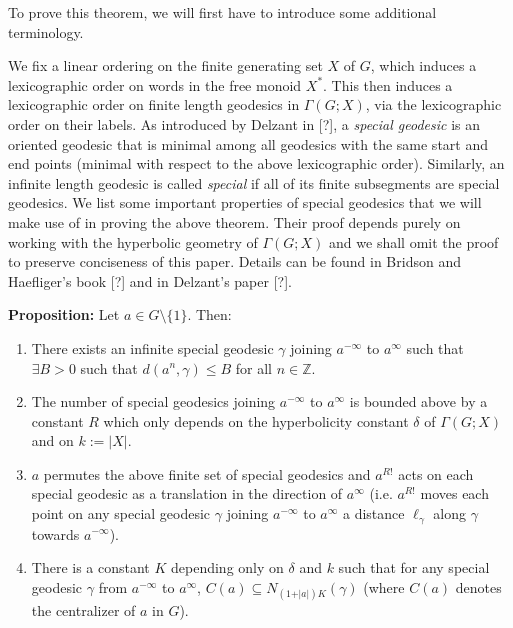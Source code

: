 \documentclass[12pt]{article}
\newcommand{\vs}{\vskip10pt}
\begin{document}
	\vs 
	
	To prove this theorem, we will first have to introduce some additional terminology. 
	
	\vs 
	
	We fix a linear ordering on the finite generating set $X$ of $G$, which induces a lexicographic order on words in the free monoid $X^*$. This then induces a lexicographic order on finite length geodesics in $\Gamma(G; X)$, via the lexicographic order on their labels. As introduced by Delzant in [?], a \textit{special geodesic} is an oriented geodesic that is minimal among all geodesics with the same start and end points (minimal with respect to the above lexicographic order). Similarly, an infinite length geodesic is called \textit{special} if all of its finite subsegments are special geodesics. We list some important properties of special geodesics that we will make use of in proving the above theorem. Their proof depends purely on working with the hyperbolic geometry of $\Gamma(G; X)$ and we shall omit the proof to preserve conciseness of this paper. Details can be found in Bridson and Haefliger's book [?] and in Delzant's paper [?]. 
	
	\vs 
	
	\textbf{Proposition: } Let $a \in G \setminus \{1\}$. Then: 
	
	\begin{enumerate}[label = (\roman*)]
		\item There exists an infinite special geodesic $\gamma$ joining $a^{-\infty}$ to $a^{\infty}$ such that $\exists B > 0$ such that $d(a^n, \gamma) \leq B$ for all $n \in \mathbb{Z}$. 
		\item The number of special geodesics joining $a^{-\infty}$ to $a^{\infty}$ is bounded above by a constant $R$ which only depends on the hyperbolicity constant $\delta$ of $\Gamma(G; X)$ and on $k := \vert X \vert$. 
		\item $a$ permutes the above finite set of special geodesics and $a^{R!}$ acts on each special geodesic as a translation in the direction of $a^{\infty}$ (i.e. $a^{R!}$ moves each point on any special geodesic $\gamma$ joining $a^{-\infty}$ to $a^{\infty}$ a distance $\ell_{\gamma}$ along $\gamma$ towards $a^{- \infty}$). 
		\item There is a constant $K$ depending only on $\delta$ and $k$ such that for any special geodesic $\gamma$ from $a^{-\infty}$ to $a^{\infty}$, $C(a) \subseteq N_{(1 + \vert a \vert)K}(\gamma)$ (where $C(a)$ denotes the centralizer of $a$ in $G$). 
	\end{enumerate}
	
\end{document}
